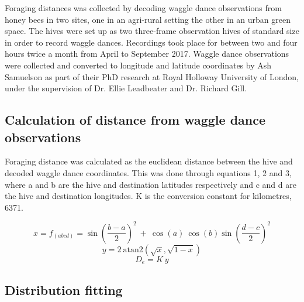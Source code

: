 \documentclass[11pt,usenames,dvipsnames,a4paper]{article}
\begin{document}
\begin{linenumbers}
\hspace{\parindent}
Foraging distances was collected by decoding waggle dance observations from honey bees in two sites, one in an agri-rural setting the other in an urban green space. The hives were set up as two three-frame observation hives of standard size in order to record waggle dances. Recordings took place for between two and four hours twice a month from April to September 2017. Waggle dance observations were collected and converted to longitude and latitude coordinates by Ash Samuelson as part of their PhD research at Royal Holloway University of London, under the supervision of Dr. Ellie Leadbeater and Dr. Richard Gill.
\end{linenumbers}

\subsection{Calculation of distance from waggle dance observations}

\begin{linenumbers}
\hspace{\parindent}
Foraging distance was calculated as the euclidean distance between the hive and decoded waggle dance coordinates. This was done through equations 1, 2 and 3, where a and b are the hive and destination latitudes respectively and c and d are the hive and destination longitudes. K is the conversion constant for kilometres, 6371.
\end{linenumbers}
\begin{equation}
x = f_{(abcd)} = \sin\left(\frac{b - a}{2}\right)^2\ +\ \cos(a)\ \cos(b) \sin\left(\frac{d - c}{2}\right)^2 
\end{equation}
\begin{equation}
y = 2\ \text{atan2}(\sqrt{x}, \sqrt{1 - x})
\end{equation}
\begin{equation}
D_e = K\ y
\end{equation}

\subsection{Distribution fitting}
\end{document}
